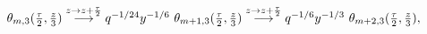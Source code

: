\begin{equation}
  \begin{array}{l}
  \theta_{m,3}({\tau\over 2}, {z\over 3})
  \stackrel{z\to z+{\tau\over 2}}{\longrightarrow} q^{-1/24}
  y^{-1/6} ~\theta_{m+1,3}({\tau\over 2}, {z\over 3})
  \stackrel{z\to z+{\tau\over 2}}{\longrightarrow} q^{-1/6}
  y^{-1/3} ~\theta_{m+2,3}({\tau\over 2}, {z\over 3}),
  \end{array}
\end{equation}

